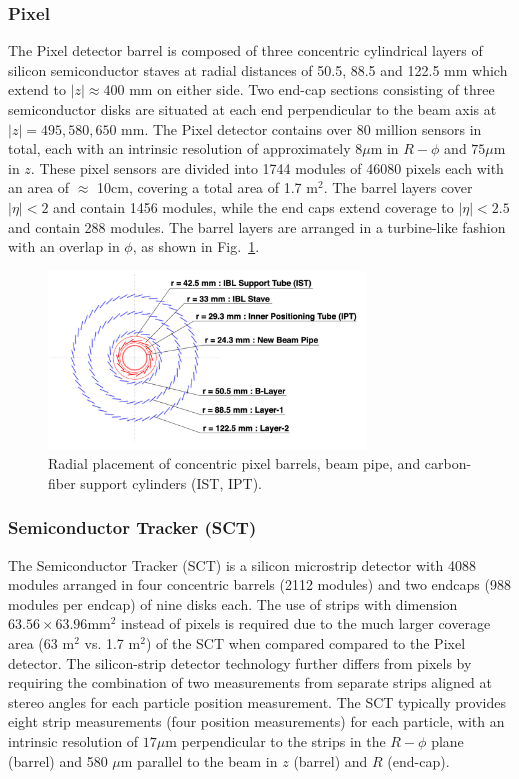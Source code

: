 \subsubsection{Pixel}
The Pixel detector barrel is composed of three concentric cylindrical layers of silicon semiconductor staves at radial distances of 50.5, 88.5 and 122.5 mm which extend to $|z| \approx 400$ mm on either side.
Two end-cap sections consisting of three semiconductor disks are situated at each end perpendicular to the beam axis at $|z| = 495, 580, 650$ mm.
The Pixel detector contains over 80 million sensors in total, each with an intrinsic resolution of approximately $8\mu$m in $R-\phi$ and $75\mu$m in $z$.
These pixel sensors are divided into 1744 modules of 46080 pixels each with an area of $\approx$ 10cm, covering a total area of 1.7 $\mathrm{m}^2$.
The barrel layers cover $|\eta| < 2$ and contain 1456 modules, while the end caps extend coverage to $|\eta| < 2.5$ and contain 288 modules.
The barrel layers are arranged in a turbine-like fashion with an overlap in $\phi$, as shown in Fig.~\ref{fig:pixel_ibl_cross_section}.

\begin{figure}
	\centering
	\includegraphics[width=0.75\textwidth]{pixel_ibl_cross_section}
	\caption{Radial placement of concentric pixel barrels, beam pipe, and carbon-fiber support cylinders (IST, IPT). \cite{Pernegger:1985432} }
	\label{fig:pixel_ibl_cross_section}
\end{figure}

\subsubsection{Semiconductor Tracker (SCT)}
The Semiconductor Tracker (SCT) is a silicon microstrip detector with 4088 modules arranged in four concentric barrels (2112 modules) and two endcaps (988 modules per endcap) of nine disks each.
The use of strips with dimension $63.56 \times 63.96$mm$^2$ instead of pixels is required due to the much larger coverage area (63 $\mathrm{m}^2$ vs. 1.7 $\mathrm{m}^2$) of the SCT when compared compared to the Pixel detector.
The silicon-strip detector technology further differs from pixels by requiring the combination of two measurements from separate strips aligned at stereo angles for each particle position measurement.
The SCT typically provides eight strip measurements (four position measurements) for each particle, with an intrinsic resolution of $17 \mu$m perpendicular to the strips in the $R-\phi$ plane (barrel) and 580 $\mu$m parallel to the beam in $z$ (barrel) and $R$ (end-cap).

